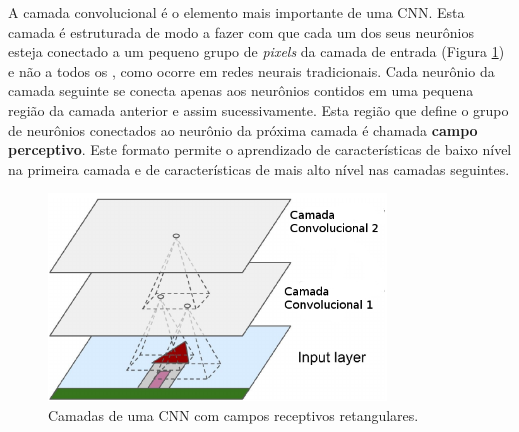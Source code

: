 A camada convolucional é o elemento mais importante de uma CNN. Esta camada é estruturada
de modo a fazer com que cada um dos seus neurônios esteja conectado a um 
pequeno grupo de \textit{pixels} da camada de entrada (Figura \ref{fig:cnn_arq}) e não a todos os , como
ocorre em redes neurais tradicionais. Cada neurônio da camada seguinte se conecta apenas aos neurônios
contidos em uma pequena região da camada anterior e assim sucessivamente. Esta região que define
o grupo de neurônios conectados ao neurônio da próxima camada é chamada \textbf{campo perceptivo}.
Este formato permite o aprendizado de características de baixo nível na primeira camada e de
características de mais alto nível nas camadas seguintes.
\begin{figure}[htp]
\begin{center}
  \includegraphics[width=0.8\textwidth]{fig/cnn_arq}
  \caption{Camadas de uma CNN com campos receptivos retangulares.}
  \label{fig:cnn_arq}
\end{center}
\end{figure}

